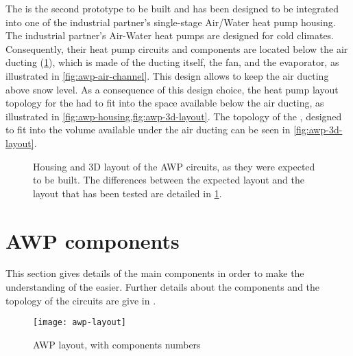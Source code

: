 The \AWP{} is the second prototype to be built and has been designed to be
integrated into one of the industrial partner's single-stage Air/Water
heat pump housing. The industrial partner's Air-Water heat pumps are
designed for cold climates. Consequently, their heat pump circuits and
components are located below the air ducting
(\cref{fig:awp-housing-and-3d}), which is made of the ducting itself,
the fan, and the evaporator, as illustrated in
\cref{fig:awp-air-channel}. This design allows to keep the air ducting
above snow level. As a consequence of this design choice, the heat
pump layout topology for the \AWP{} had to fit into the space
available below the air ducting, as illustrated in
\cref{fig:awp-housing,fig:awp-3d-layout}. The topology of the \AWP{},
designed to fit into the volume available under the air ducting can be
seen in \cref{fig:awp-3d-layout}.

\begin{figure}[htbp]
  \centering {}
  \caption[Housing and 3D layout of the AWP circuits]{Housing and 3D
    layout of the AWP circuits, as they were expected to be built. The
    differences between the expected layout and the layout that has
    been tested are detailed in \cref{sec:awp-main-components}.}
  \label{fig:awp-housing-and-3d}
\end{figure}

\section{AWP components}
\label{sec:awp-main-components}

This section gives details of the main components in order to
make the understanding of the
 easier. Further
details about the components and the topology of the circuits are give
in .

\begin{figure}[htbp]
  \centering
  \texttt{[image: awp-layout]}
  \caption[AWP layout with components numbers]
  {AWP layout, with components numbers}
  \label{fig:awp-layout-model-numbers}
\end{figure}


